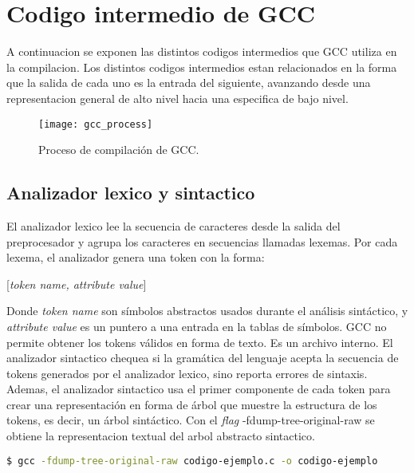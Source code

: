 \chapter{Codigo intermedio de GCC}

A continuacion se exponen las distintos codigos intermedios que GCC utiliza en la compilacion. 
Los distintos codigos intermedios estan relacionados en la forma que la salida 
de cada uno es la entrada del siguiente, avanzando desde una representacion general de alto nivel 
hacia una especifica de bajo nivel. 

\begin{figure}[ht]
    \begingroup
        \centering
            \texttt{[image: gcc\_process]}
            \caption{Proceso de compilación de GCC.}
            \label{fig:gcc_process}
        \par
    \endgroup
\end{figure}

\section{Analizador lexico y sintactico}
El analizador lexico lee la secuencia de caracteres desde la salida del preprocesador y agrupa los 
caracteres en secuencias llamadas lexemas.
Por cada lexema, el analizador genera una token con la forma:
\begin{center}
    [\emph{token name, attribute value}]
\end{center}
Donde \emph{token name} son símbolos abstractos usados durante el análisis sintáctico,
y \emph{attribute value} es un puntero a una entrada en la tablas de símbolos.
GCC no permite obtener los tokens válidos en forma de texto. Es un archivo interno.
El analizador sintactico chequea si la gramática del lenguaje acepta la secuencia
de tokens generados por el analizador lexico, sino reporta errores de sintaxis. 
Ademas, el analizador sintactico usa el primer componente de cada token para crear una representación en forma de árbol 
que muestre la estructura de los tokens, es decir, un árbol sintáctico.
Con el \emph{flag} -fdump-tree-original-raw se obtiene la representacion textual del arbol abstracto sintactico.

\begin{lstlisting}[label=comandoC, caption= Comando de compilación para obtener codigo-ejemplo.c.005t.original \cite{repositorio} para GCC., language=bash]
    $ gcc -fdump-tree-original-raw codigo-ejemplo.c -o codigo-ejemplo  \end{lstlisting}

